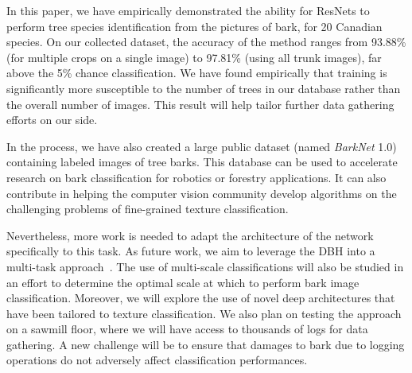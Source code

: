 \documentclass[letterpaper, 10 pt, conference]{ieeeconf}  %
\begin{document}
In this paper, we have empirically demonstrated the ability for ResNets to perform tree species identification from the pictures of bark, for 20 Canadian species. On our collected dataset, the accuracy of the method ranges from 93.88\% (for multiple crops on a single image) to 97.81\% (using all trunk images), far above the 5\% chance classification. We have found empirically that training is significantly more susceptible to the number of trees in our database rather than the overall number of images. This result will help tailor further data gathering efforts on our side.

In the process, we have also created a large public dataset (named \emph{BarkNet} 1.0) containing labeled images of tree barks. This database can be used to accelerate research on bark classification for robotics or forestry applications. It can also contribute in helping the computer vision community develop algorithms on the challenging problems of fine-grained texture classification. 

Nevertheless, more work is needed to adapt the architecture of the network specifically to this task. As future work, we aim to leverage the DBH into a multi-task approach~\cite{Trottier2017}. The use of multi-scale classifications will also be studied in an effort to determine the optimal scale at which to perform bark image classification. Moreover, we will explore the use of novel deep architectures that have been tailored to texture classification. We also plan on testing the approach on a sawmill floor, where we will have access to thousands of logs for data gathering. A new challenge will be to ensure that damages to bark due to logging operations do not adversely affect classification performances.

\addtolength{\textheight}{-8.4cm}   %

\end{document}
